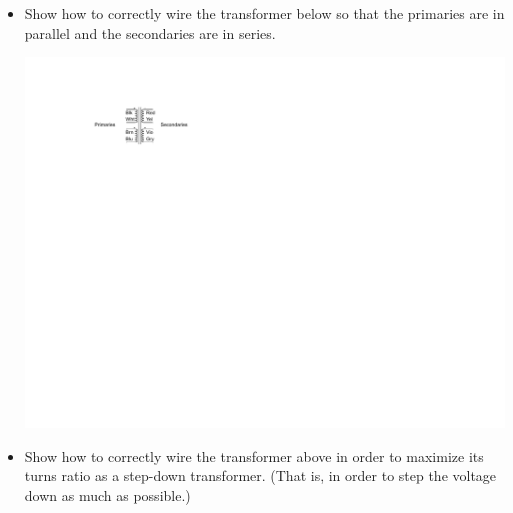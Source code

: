 \begin{itemize}

\item Show how to correctly wire the transformer below so that the primaries are in parallel and the secondaries are in series.

\begin{center}
\includegraphics{transformers/transformer_wiring.pdf}
\end{center}

\item Show how to correctly wire the transformer above in order to maximize its turns ratio as a step-down transformer.  (That is, in order to step the voltage down as much as possible.)

\end{itemize}



